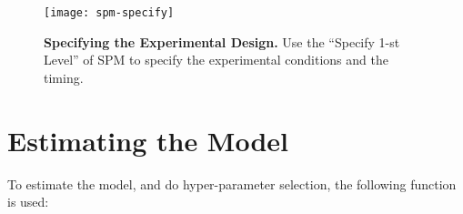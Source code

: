 \begin{figure}
\centering
\texttt{[image: spm-specify]}
    \caption[Specifying the Experimental Design.]
    {\textbf{Specifying the Experimental Design.}
    Use the ``Specify 1-st Level'' of SPM to specify the
    experimental conditions and the timing.
    \label{fig:specify}
    }
\end{figure}



\section{Estimating the Model}

To estimate the model, and do hyper-parameter selection, the following function
is used:

